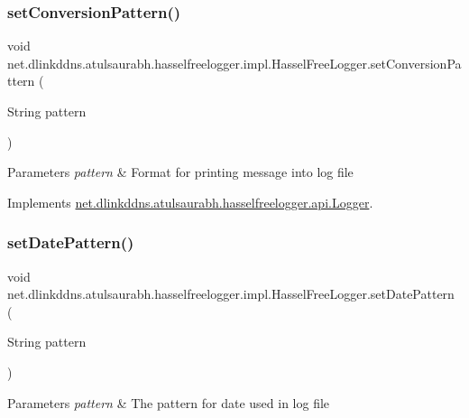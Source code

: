 \subsubsection{\texorpdfstring{set\+Conversion\+Pattern()}{setConversionPattern()}}
{\footnotesize\ttfamily void net.\+dlinkddns.\+atulsaurabh.\+hasselfreelogger.\+impl.\+Hassel\+Free\+Logger.\+set\+Conversion\+Pattern (\begin{DoxyParamCaption}\item[{String}]{pattern }\end{DoxyParamCaption})}


\begin{DoxyParams}{Parameters}
{\em pattern} & Format for printing message into log file \\
\hline
\end{DoxyParams}


Implements \mbox{\hyperlink{interfacenet_1_1dlinkddns_1_1atulsaurabh_1_1hasselfreelogger_1_1api_1_1_logger_a5a1b9dac86c15782309e01d5327e4299}{net.\+dlinkddns.\+atulsaurabh.\+hasselfreelogger.\+api.\+Logger}}.

\mbox{\label{classnet_1_1dlinkddns_1_1atulsaurabh_1_1hasselfreelogger_1_1impl_1_1_hassel_free_logger_a72529568d69eea543b2238a466cedf8d}} 
\subsubsection{\texorpdfstring{set\+Date\+Pattern()}{setDatePattern()}}
{\footnotesize\ttfamily void net.\+dlinkddns.\+atulsaurabh.\+hasselfreelogger.\+impl.\+Hassel\+Free\+Logger.\+set\+Date\+Pattern (\begin{DoxyParamCaption}\item[{String}]{pattern }\end{DoxyParamCaption})}


\begin{DoxyParams}{Parameters}
{\em pattern} & The pattern for date used in log file \\
\hline
\end{DoxyParams}


